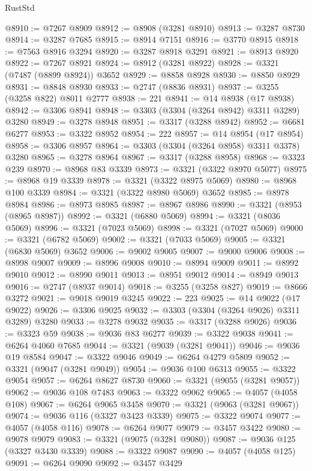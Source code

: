 \begin{lexlean}{RustStd}
\begin{coremodule}
@8910 := @7267 @8909
@8912 := @8908 (@3281 @8910)
@8913 := @3287 @8730
@8914 := @3287 @7685
@8915 := @8914 @7151
@8916 := @3770 @8915
@8918 := @7563 @8916 @3294
@8920 := @3287 @8918 @3291
@8921 := @8913 @8920
@8922 := @7267 @8921
@8924 := @8912 (@3281 @8922)
@8928 := @3321 (@7487 (@8899 @8924)) @3652
@8929 := @8858 @8928
@8930 := @8850 @8929
@8931 := @8848 @8930
@8933 := @2747 (@8836 @8931)
@8937 := @3255 (@3258 @822) @8011 @2777
@8938 := 221
@8941 := @14 @8938 (@17 @8938)
@8942 := @3306 @8941
@8948 := @3303 (@3304 (@3264 @8942) @3311 @3289) @3280
@8949 := @3278 @8948
@8951 := @3317 (@3288 @8942)
@8952 := @6681 @6277
@8953 := @3322 @8952
@8954 := 222
@8957 := @14 @8954 (@17 @8954)
@8958 := @3306 @8957
@8964 := @3303 (@3304 (@3264 @8958) @3311 @3378) @3280
@8965 := @3278 @8964
@8967 := @3317 (@3288 @8958)
@8968 := @3323 @239
@8970 := @8968 @83 @3339
@8973 := @3321 (@3322 @8970 @5077)
@8975 := @8968 @19 @3339
@8978 := @3321 (@3322 @8975 @5069)
@8980 := @8968 @100 @3339
@8984 := @3321 (@3322 @8980 @5069) @3652
@8985 := @8978 @8984
@8986 := @8973 @8985
@8987 := @8967 @8986
@8990 := @3321 (@8953 (@8965 @8987))
@8992 := @3321 (@6880 @5069)
@8994 := @3321 (@8036 @5069)
@8996 := @3321 (@7023 @5069)
@8998 := @3321 (@7027 @5069)
@9000 := @3321 (@6782 @5069)
@9002 := @3321 (@7033 @5069)
@9005 := @3321 (@6830 @5069) @3652
@9006 := @9002 @9005
@9007 := @9000 @9006
@9008 := @8998 @9007
@9009 := @8996 @9008
@9010 := @8994 @9009
@9011 := @8992 @9010
@9012 := @8990 @9011
@9013 := @8951 @9012
@9014 := @8949 @9013
@9016 := @2747 (@8937 @9014)
@9018 := @3255 (@3258 @827)
@9019 := @8666 @3272
@9021 := @9018 @9019 @3245
@9022 := 223
@9025 := @14 @9022 (@17 @9022)
@9026 := @3306 @9025
@9032 := @3303 (@3304 (@3264 @9026) @3311 @3289) @3280
@9033 := @3278 @9032
@9035 := @3317 (@3288 @9026)
@9036 := @3323 @59
@9038 := @9036 @83 @6277
@9039 := @3322 @9038
@9041 := @6264 @4060 @7685
@9044 := @3321 (@9039 (@3281 @9041))
@9046 := @9036 @19 @8584
@9047 := @3322 @9046
@9049 := @6264 @4279 @5809
@9052 := @3321 (@9047 (@3281 @9049))
@9054 := @9036 @100 @6313
@9055 := @3322 @9054
@9057 := @6264 @8627 @8730
@9060 := @3321 (@9055 (@3281 @9057))
@9062 := @9036 @108 @7483
@9063 := @3322 @9062
@9065 := @4057 (@4058 @108)
@9067 := @6264 @9065 @3458
@9070 := @3321 (@9063 (@3281 @9067))
@9074 := @9036 @116 (@3327 @3423 @3339)
@9075 := @3322 @9074
@9077 := @4057 (@4058 @116)
@9078 := @6264 @9077
@9079 := @3457 @3422
@9080 := @9078 @9079
@9083 := @3321 (@9075 (@3281 @9080))
@9087 := @9036 @125 (@3327 @3430 @3339)
@9088 := @3322 @9087
@9090 := @4057 (@4058 @125)
@9091 := @6264 @9090
@9092 := @3457 @3429

\end{coremodule}
\end{lexlean}
